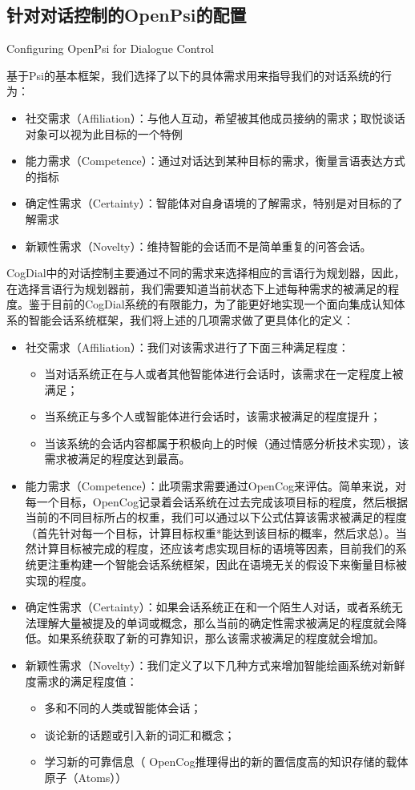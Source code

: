\subsection{针对对话控制的OpenPsi的配置}{Configuring OpenPsi for Dialogue Control}

基于Psi的基本框架，我们选择了以下的具体需求用来指导我们的对话系统的行为：
\begin{itemize}
\item 社交需求（Affiliation）：与他人互动，希望被其他成员接纳的需求；取悦谈话对象可以视为此目标的一个特例
\item 能力需求（Competence）：通过对话达到某种目标的需求，衡量言语表达方式的指标
\item 确定性需求（Certainty）：智能体对自身语境的了解需求，特别是对目标的了解需求
\item 新颖性需求（Novelty）：维持智能的会话而不是简单重复的问答会话。
\end{itemize}

CogDial中的对话控制主要通过不同的需求来选择相应的言语行为规划器，因此，在选择言语行为规划器前，我们需要知道当前状态下上述每种需求的被满足的程度。鉴于目前的CogDial系统的有限能力，为了能更好地实现一个面向集成认知体系的智能会话系统框架，我们将上述的几项需求做了更具体化的定义：

\begin{itemize}
\item 社交需求（Affiliation）：我们对该需求进行了下面三种满足程度：
\begin{itemize}
\item 当对话系统正在与人或者其他智能体进行会话时，该需求在一定程度上被满足；
\item 当系统正与多个人或智能体进行会话时，该需求被满足的程度提升；
\item  当该系统的会话内容都属于积极向上的时候（通过情感分析技术实现），该需求被满足的程度达到最高。
\end{itemize}
\item 能力需求（Competence）：此项需求需要通过OpenCog来评估。简单来说，对每一个目标，OpenCog记录着会话系统在过去完成该项目标的程度，然后根据当前的不同目标所占的权重，我们可以通过以下公式估算该需求被满足的程度（首先针对每一个目标，计算目标权重*能达到该目标的概率，然后求总）。当然计算目标被完成的程度，还应该考虑实现目标的语境等因素，目前我们的系统更注重构建一个智能会话系统框架，因此在语境无关的假设下来衡量目标被实现的程度。
\item 确定性需求（Certainty）：如果会话系统正在和一个陌生人对话，或者系统无法理解大量被提及的单词或概念，那么当前的确定性需求被满足的程度就会降低。如果系统获取了新的可靠知识，那么该需求被满足的程度就会增加。
\item 新颖性需求（Novelty）：我们定义了以下几种方式来增加智能绘画系统对新鲜度需求的满足程度值：
\begin{itemize}
\item 多和不同的人类或智能体会话；
\item 谈论新的话题或引入新的词汇和概念；
\item 学习新的可靠信息（ OpenCog推理得出的新的置信度高的知识存储的载体原子（Atoms））
\end{itemize}
\end{itemize}

